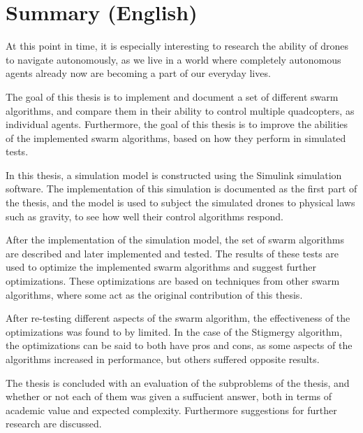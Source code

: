 \chapter{Summary (English)}

At this point in time, it is especially interesting to research the ability of drones to navigate autonomously, as we live in a world where completely autonomous agents already now are becoming a part of our everyday lives. 

The goal of this thesis is to implement and document a set of different swarm algorithms, and compare them in their ability to control multiple quadcopters, as individual agents. Furthermore, the goal of this thesis is to improve the abilities of the implemented swarm algorithms, based on how they perform in simulated tests.

In this thesis, a simulation model is constructed using the Simulink simulation software. The implementation of this simulation is documented as the first part of the thesis, and the model is used to subject the simulated drones to physical laws such as gravity, to see how well their control algorithms respond.

After the implementation of the simulation model, the set of swarm algorithms are described and later implemented and tested. The results of these tests are used to optimize the implemented swarm algorithms and suggest further optimizations. These optimizations are based on techniques from other swarm algorithms, where some act as the original contribution of this thesis. 

After re-testing different aspects of the swarm algorithm, the effectiveness of the optimizations was found to by limited. In the case of the Stigmergy algorithm, the optimizations can be said to both have pros and cons, as some aspects of the algorithms increased in performance, but others suffered opposite results.

The thesis is concluded with an evaluation of the subproblems of the thesis, and whether or not each of them was given a suffucient answer, both in terms of academic value and expected complexity. Furthermore suggestions for further research are discussed. 
